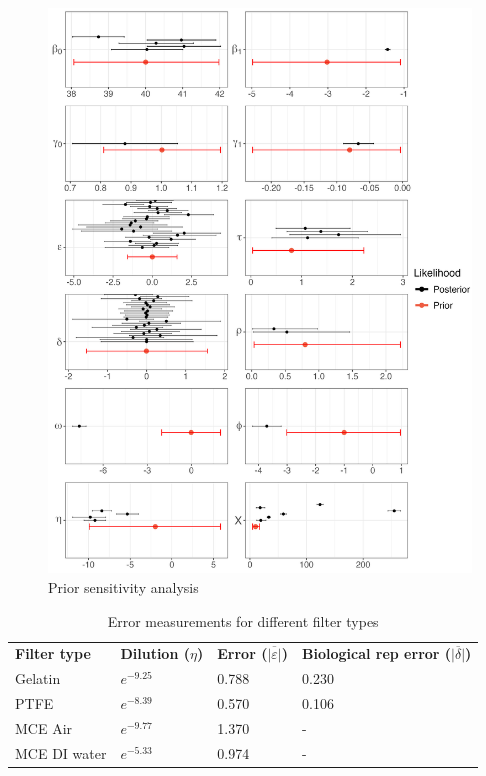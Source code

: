 \documentclass{article}
\begin{document}
\begin{figure}[tbhp] 
\centering
\includegraphics[width=16.5cm]{Plots/Diagnostic_Fig_2.jpg}  
\caption{Prior sensitivity analysis}
\label{fig:prior_sens}
\end{figure}


\begin{table}[h!]
\centering
\caption{Error measurements for different filter types}
\label{tab:filter_error}

\begin{tabular}{llll}
\textbf{Filter type} & \textbf{Dilution ($\eta$)} & \textbf{Error ($\overline{|\varepsilon|}$)} & \textbf{Biological rep error ($\overline{|\delta|}$)} \\
Gelatin & $e^{-9.25}$ & 0.788 & 0.230 \\
PTFE & $e^{-8.39}$ & 0.570 & 0.106 \\
MCE Air & $e^{-9.77}$ & 1.370 & - \\
MCE DI water & $e^{-5.33}$ & 0.974 & - \\
\end{tabular}
\end{table}

\clearpage

\end{document}
